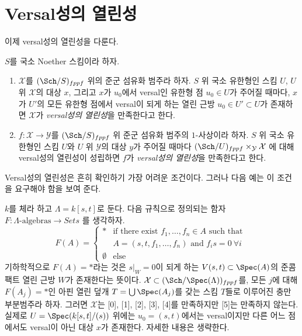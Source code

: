 \section{Versal성의 열린성}
\label{section-openness-versality}

\noindent
이제 versal성의 열린성을 다룬다.

\begin{definition}
\label{definition-openness-versality}
$S$를 국소 Noether 스킴이라 하자.
\begin{enumerate}
\item $\mathcal{X}$를 $(\Sch/S)_{fppf}$ 위의 준군 섬유화 범주라 하자.
$S$ 위 국소 유한형인 스킴 $U$, $U$ 위 $\mathcal{X}$의 대상 $x$,
그리고 $x$가 $u_0$에서 versal인 유한형 점 $u_0 \in U$가 주어질 때마다,
$x$가 $U'$의 모든 유한형 점에서 versal이 되게 하는 열린 근방
$u_0 \in U' \subset U$가 존재하면 $\mathcal{X}$가
{\it versal성의 열린성}을 만족한다고 한다.
\item $f : \mathcal{X} \to \mathcal{Y}$를 $(\Sch/S)_{fppf}$ 위
준군 섬유화 범주의 $1$-사상이라 하자.
$S$ 위 국소 유한형인 스킴 $U$와 $U$ 위 $\mathcal{Y}$의 대상 $y$가
주어질 때마다
$(\Sch/U)_{fppf} \times_\mathcal{Y} \mathcal{X}$
에 대해 versal성의 열린성이 성립하면 $f$가
{\it versal성의 열린성}을 만족한다고 한다.
\end{enumerate}
\end{definition}

\noindent
Versal성의 열린성은 흔히 확인하기 가장 어려운 조건이다. 그러나 다음
예는 이 조건을 요구해야 함을 보여 준다.

\begin{example}
\label{example-versality}
$k$를 체라 하고 $\Lambda = k[s, t]$로 둔다. 다음 규칙으로 정의되는 함자
$F : \Lambda\text{-algebras} \longrightarrow \textit{Sets}$
를 생각하자.
$$
F(A) =
\left\{
\begin{matrix}
* & \text{if there exist }f_1, \ldots, f_n \in A\text{ such that } \\
  & A = (s, t, f_1, \ldots, f_n)\text{ and } f_i s = 0\ \forall i \\
\emptyset & \text{else}
\end{matrix}
\right.
$$
기하학적으로 $F(A) = *$라는 것은 $s|_W = 0$이 되게 하는
$V(s, t) \subset \Spec(A)$의 준콤팩트 열린 근방 $W$가 존재한다는 뜻이다.
$\mathcal{X} \subset (\Sch/\Spec(\Lambda))_{fppf}$를, 모든 $j$에 대해
$F(A_j) = *$인 아핀 열린 덮개 $T = \bigcup \Spec(A_j)$를 갖는 스킴
$T$들로 이루어진 충만 부분범주라 하자. 그러면 $\mathcal{X}$는
[0], [1], [2], [3], [4]를 만족하지만 [5]는 만족하지 않는다.
실제로 $U = \Spec(k[s, t]/(s))$ 위에는 $u_0 = (s, t)$에서는 versal이지만
다른 어느 점에서도 versal이 아닌 대상 $x$가 존재한다. 자세한 내용은
생략한다.
\end{example}

